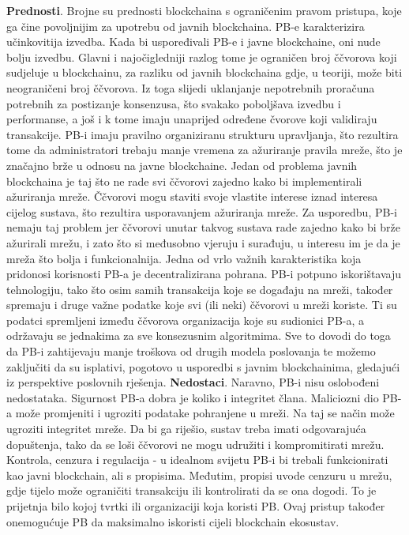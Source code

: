 \documentclass[times, utf8, diplomski]{fer}
\begin{document}
\textbf{Prednosti}. Brojne su prednosti blockchaina s ograničenim pravom pristupa, koje ga čine povoljnijim za upotrebu od javnih blockchaina. PB-e karakterizira učinkovitija izvedba. Kada bi uspoređivali PB-e i javne blockchaine, oni nude bolju izvedbu. Glavni i najočigledniji razlog tome je ograničen broj ččvorova koji sudjeluje u blockchainu, za razliku od javnih blockchaina gdje, u teoriji, može biti neograničeni broj ččvorova. Iz toga slijedi uklanjanje nepotrebnih proračuna potrebnih za postizanje konsenzusa, što svakako poboljšava izvedbu i performanse, a još i k tome imaju unaprijed određene čvorove koji validiraju transakcije. PB-i imaju pravilno organiziranu strukturu upravljanja, što rezultira tome da administratori trebaju manje vremena za ažuriranje pravila mreže, što je značajno brže u odnosu na javne blockchaine. Jedan od problema javnih blockchaina je taj što ne rade svi ččvorovi zajedno kako bi implementirali ažuriranja mreže. Ččvorovi mogu staviti svoje vlastite interese iznad interesa cijelog sustava, što rezultira usporavanjem ažuriranja mreže. Za usporedbu, PB-i nemaju taj problem jer ččvorovi unutar takvog sustava rade zajedno kako bi brže ažurirali mrežu, i zato što si međusobno vjeruju i surađuju, u interesu im je da je mreža što bolja i funkcionalnija. Jedna od vrlo važnih karakteristika koja pridonosi korisnosti PB-a je decentralizirana pohrana. PB-i potpuno iskorištavaju tehnologiju, tako što osim samih transakcija koje se događaju na mreži, također spremaju i druge važne podatke koje svi (ili neki) ččvorovi u mreži koriste. Ti su podatci spremljeni između ččvorova organizacija koje su sudionici PB-a, a održavaju se jednakima za sve konsezusnim algoritmima. Sve to dovodi do toga da PB-i zahtijevaju manje troškova od drugih modela poslovanja te možemo zaključiti da su isplativi, pogotovo u usporedbi s javnim blockchainima, gledajući iz perspektive poslovnih rješenja.
\textbf{Nedostaci}. Naravno, PB-i nisu oslobođeni nedostataka. Sigurnost PB-a dobra je koliko i integritet člana. Maliciozni dio PB-a može promjeniti i ugroziti podatake pohranjene u mreži. Na taj se način može ugroziti integritet mreže. Da bi ga riješio, sustav treba imati odgovarajuća dopuštenja, tako da se loši ččvorovi ne mogu udružiti i kompromitirati mrežu. Kontrola, cenzura i regulacija - u idealnom svijetu PB-i bi trebali funkcionirati kao javni blockchain, ali s propisima. Međutim, propisi uvode cenzuru u mrežu, gdje tijelo može ograničiti transakciju ili kontrolirati da se ona dogodi. To je prijetnja bilo kojoj tvrtki ili organizaciji koja koristi PB. Ovaj pristup također onemogućuje PB da maksimalno iskoristi cijeli blockchain ekosustav.
\end{document}
